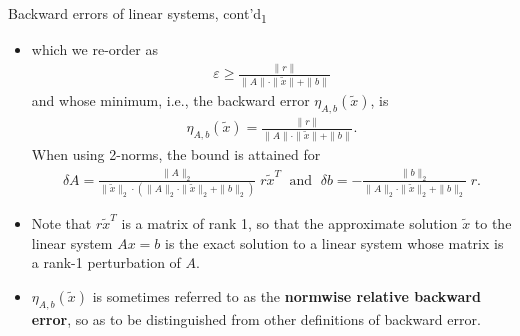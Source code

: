 \documentclass[t,usepdftitle=false]{beamer}
\begin{document}
\begin{frame}{Backward errors of linear systems, cont'd\textsubscript{1}}
\begin{itemize}
\item[]which we re-order as
\begin{align*}
\varepsilon\geq\frac{\|r\|}{\|A\|\cdot\|\tilde{x}\|+\|b\|}
\end{align*}
and whose minimum, i.e., the backward error $\eta_{A,b}(\tilde{x})$, is
\begin{align*}
\eta_{A,b}(\tilde{x})=\frac{\|r\|}{\|A\|\cdot\|\tilde{x}\|+\|b\|}.
\end{align*}
When using 2-norms, the bound is attained for
\begin{align*}
\delta A=\frac{\|A\|_2}{\|\tilde{x}\|_2\cdot(\|A\|_2\cdot\|\tilde{x}\|_2+\|b\|_2)}\;r\tilde{x}^T
\;\text{ and }\;
\delta b=-\frac{\|b\|_2}{\|A\|_2\cdot\|\tilde{x}\|_2+\|b\|_2}\; r.
\end{align*}
\item Note that $r\tilde{x}^T$ is a matrix of rank 1, so that the approximate solution $\tilde{x}$ to the linear system $Ax=b$ is the exact solution to a linear system whose matrix is a rank-1 perturbation of $A$.
\item $\eta_{A,b}(\tilde{x})$ is sometimes referred to as the \textbf{normwise relative backward error}, so as to be distinguished from other definitions of backward error.
\end{itemize}
\end{frame}
\end{document}
